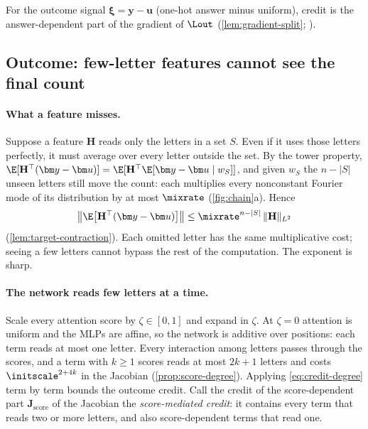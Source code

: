 For the outcome signal $\bm\xi=\bm y-\bm u$ (one-hot answer minus uniform), credit is the answer-dependent part of the gradient of
$\Lout$ (\cref{lem:gradient-split}; \citealp{shalevshwartz2017failures,abbe2025parities}).

\subsection{Outcome: few-letter features cannot see the final count}
\paragraph{What a feature misses.} Suppose a feature $\mathbf H$ reads only the letters in a set $S$. Even if it uses those letters perfectly,
it must average over every letter outside the set. By the tower property,
$\E[\mathbf H^\top(\bm y-\bm u)]=\E[\mathbf H^\top\E[\bm y-\bm u\mid w_S]]$, and given $w_S$ the $n-|S|$ unseen letters still move the count: each
multiplies every nonconstant Fourier mode of its distribution by at most $\mixrate$ (\cref{fig:chain}a). Hence
\begin{equation}
 \bigl\|\E\bigl[\mathbf H^\top(\bm y-\bm u)\bigr]\bigr\|\le\mixrate^{n-|S|}\,\|\mathbf H\|_{L^2}
 \label{eq:credit-degree}
\end{equation}
(\cref{lem:target-contraction}). Each omitted letter has the same multiplicative cost; seeing a few letters cannot bypass the rest of
the computation. The exponent is sharp.

\paragraph{The network reads few letters at a time.} Scale every attention score by $\zeta\in[0,1]$ and expand in $\zeta$. At $\zeta=0$ attention is uniform
and the MLPs are affine, so the network is additive over positions: each term reads at most one letter. Every interaction among letters
passes through the scores, and a term with $k\ge1$ scores reads at most $2k+1$ letters and costs $\initscale^{2+4k}$ in the Jacobian
(\cref{prop:score-degree}). Applying \cref{eq:credit-degree} term by term bounds the outcome credit. Call the credit of the score-dependent part
$\mathbf J_{\mathrm{score}}$ of the Jacobian the \emph{score-mediated credit}: it contains every term that reads two or more letters, and
also score-dependent terms that read one.

